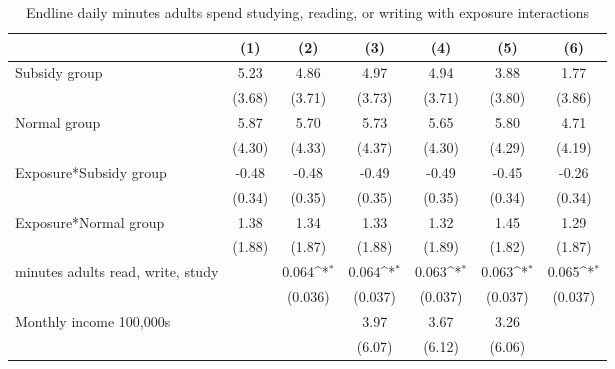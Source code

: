 \begin{table}[htbp]\centering
\def\sym#1{\ifmmode^{#1}\else\(^{#1}\)\fi}
\caption{Endline daily minutes adults spend studying, reading, or writing with exposure interactions}
\begin{tabular*}{1\hsize}{@{\hskip\tabcolsep\extracolsep\fill}l*{6}{c}}
\toprule
                &\multicolumn{1}{c}{(1)}         &\multicolumn{1}{c}{(2)}         &\multicolumn{1}{c}{(3)}         &\multicolumn{1}{c}{(4)}         &\multicolumn{1}{c}{(5)}         &\multicolumn{1}{c}{(6)}         \\
\midrule
Subsidy group   &     5.23         &     4.86         &     4.97         &     4.94         &     3.88         &     1.77         \\
                &   (3.68)         &   (3.71)         &   (3.73)         &   (3.71)         &   (3.80)         &   (3.86)         \\
Normal group    &     5.87         &     5.70         &     5.73         &     5.65         &     5.80         &     4.71         \\
                &   (4.30)         &   (4.33)         &   (4.37)         &   (4.30)         &   (4.29)         &   (4.19)         \\
Exposure*Subsidy group&    -0.48         &    -0.48         &    -0.49         &    -0.49         &    -0.45         &    -0.26         \\
                &   (0.34)         &   (0.35)         &   (0.35)         &   (0.35)         &   (0.34)         &   (0.34)         \\
Exposure*Normal group&     1.38         &     1.34         &     1.33         &     1.32         &     1.45         &     1.29         \\
                &   (1.88)         &   (1.87)         &   (1.88)         &   (1.89)         &   (1.82)         &   (1.87)         \\
minutes adults read, write, study&                  &    0.064\sym{*}  &    0.064\sym{*}  &    0.063\sym{*}  &    0.063\sym{*}  &    0.065\sym{*}  \\
                &                  &  (0.036)         &  (0.037)         &  (0.037)         &  (0.037)         &  (0.037)         \\
Monthly income 100,000s&                  &                  &     3.97         &     3.67         &     3.26         &                  \\
                &                  &                  &   (6.07)         &   (6.12)         &   (6.06)         &                  \\

\end{tabular*}
\end{table}
